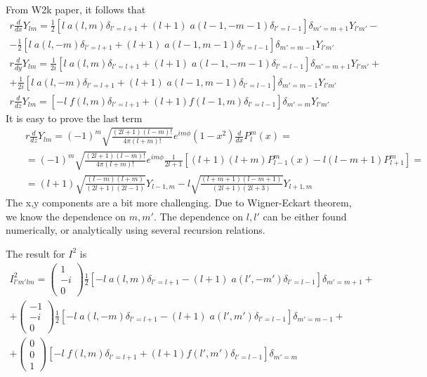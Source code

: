\documentclass[aps,prb,floatfix,epsfig,singlecolumn,showpacs,preprintnumbers]{revtex4}
\begin{document}
From W2k paper, it follows that
\begin{eqnarray}
r\frac{d}{dx}Y_{lm}=
\frac{1}{2}\left[
l\; a(l,m)\delta_{l'=l+1}+
(l+1)\; a(l-1,-m-1)\delta_{l'=l-1}
\right]\delta_{m'=m+1}Y_{l'm'}
-\\-
\frac{1}{2}
\left[l\; a(l,-m) \delta_{l'=l+1}+(l+1)\; a(l-1,m-1)\delta_{l'=l-1}
\right]\delta_{m'=m-1} Y_{l'm'}
\\
r\frac{d}{dy}Y_{lm}=
\frac{1}{2i}\left[
l\; a(l,m)\delta_{l'=l+1}+
(l+1)\; a(l-1,-m-1)\delta_{l'=l-1}
\right]\delta_{m'=m+1}Y_{l'm'}
+\\+
\frac{1}{2i}
\left[l\; a(l,-m) \delta_{l'=l+1}+(l+1)\; a(l-1,m-1)\delta_{l'=l-1}
\right]\delta_{m'=m-1} Y_{l'm'}\\
r\frac{d}{dz}Y_{lm}=
\left[-l\; f(l,m) \delta_{l'=l+1}
+
(l+1) f(l-1,m)\delta_{l'=l-1}
\right]\delta_{m'=m} Y_{l'm'}
\end{eqnarray}
It is easy to prove the last term
\begin{eqnarray}
&& r\frac{d}{dz} Y_{lm}= 
(-1)^m\sqrt{\frac{(2l+1)(l-m)!}{4\pi (l+m)!}} e^{im\phi} (1-x^2) \frac{d}{d x}  P_l^m(x)=\\
&& =(-1)^m\sqrt{\frac{(2l+1)(l-m)!}{4\pi (l+m)!}} e^{im\phi}\frac{1}{2l+1}
\left[(l+1)(l+m) P_{l-1}^{m}(x)-l(l-m+1) P_{l+1}^m\right]=\\
&& =(l+1)\sqrt{\frac{(l-m)(l+m)}{(2l+1)(2l-1)}} Y_{l-1,m} 
-l \sqrt{\frac{(l+m+1)(l-m+1)}{(2l+1)(2l+3)}}Y_{l+1,m}
\end{eqnarray}
The x,y components are a bit more challenging. Due to Wigner-Eckart
theorem, we know the dependence on $m,m'$. The dependence on $l,l'$
can be either found numerically, or analytically using several recursion relations.

The result for $I^2$ is
\begin{eqnarray}
I^2_{l'm'lm}=
\left(
\begin{array}{c}
1\\
-i\\
0
\end{array}
\right)
\frac{1}{2}\left[
-l\; a(l,m)\delta_{l'=l+1}-
(l+1)\; a(l',-m')\delta_{l'=l-1}
\right]\delta_{m'=m+1}
+\\+
\left(
\begin{array}{c}
-1\\
-i\\
0
\end{array}
\right)
\frac{1}{2}
\left[-l\; a(l,-m) \delta_{l'=l+1}-(l+1)\; a(l',m')\delta_{l'=l-1}
\right]\delta_{m'=m-1} 
+\\+
\left(
\begin{array}{c}
0\\
0\\
1
\end{array}
\right)
\left[-l\; f(l,m) \delta_{l'=l+1}
+
(l+1) f(l',m')\delta_{l'=l-1}
\right]\delta_{m'=m}
\end{eqnarray}
\end{document}
